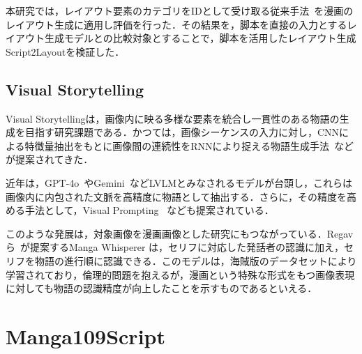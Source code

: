 本研究では，レイアウト要素のカテゴリをIDとして受け取る従来手法~\cite{layoutdm,layoutformer}を漫画のレイアウト生成に適用し評価を行った．その結果を，脚本を直接の入力とするレイアウト生成モデルとの比較対象とすることで，脚本を活用したレイアウト生成Script2Layoutを検証した．

\subsection{Visual Storytelling}
Visual Storytellingは，画像内に映る多様な要素を統合し一貫性のある物語の生成を目指す研究課題である．かつては，画像シーケンスの入力に対し，CNNによる特徴量抽出をもとに画像間の連続性をRNNにより捉える物語生成手法~\cite{vist}などが提案されてきた．

近年は，GPT-4o~\cite{gpt4}やGemini~\cite{gemini}などLVLMとみなされるモデルが台頭し，これらは画像内に内包された文脈を高精度に物語として抽出する．さらに，その精度を高める手法として，Visual Prompting ~\cite{visualprompt}なども提案されている．

このような発展は，対象画像を漫画画像とした研究にもつながっている．Regavら~\cite{mangawhisper}が提案するManga Whisperer は，セリフに対応した発話者の認識に加え，セリフを物語の進行順に認識できる．このモデルは，海賊版のデータセットにより学習されており，倫理的問題を抱えるが，漫画という特殊な形式をもつ画像表現に対しても物語の認識精度が向上したことを示すものであるといえる．

\section{Manga109Script}



